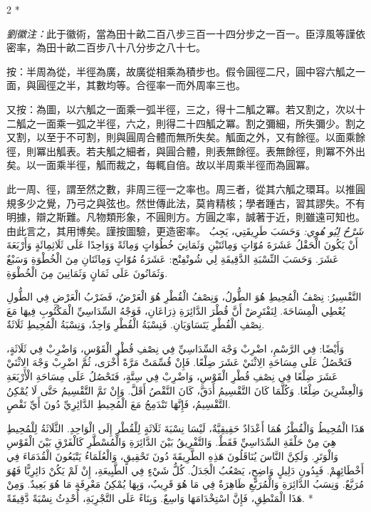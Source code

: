 \documentclass[11pt,a4paper]{article}
\newcommand{\ar}[1]{\arabicfont\beginR #1\endR}
\newenvironment{bilingual}{%
  \begin{paracol}{2}%
  \switchcolumn[0]*%
}{%
  \end{paracol}%
}
\newcommand{\cnline}[1]{\switchcolumn[0]\noindent #1 \switchcolumn[1]}
\newcommand{\arline}[1]{\noindent\ar{#1} \switchcolumn[0]*}
\newenvironment{prob bilingual}{%
  \begin{paracol}{2}%
  \switchcolumn[0]*%
}{%
  \end{paracol}%
  \vspace{0.3em}%
}
\begin{document}
\begin{bilingual}
\cnline{%
\textcolor{commentarycolor}{\small\textit{劉徽注：}}此于徽術，當為田十畝二百八步三百一十四分步之一百一。臣淳風等謹依密率，為田十畝二百步八十八分步之八十七。

按：半周為從，半徑為廣，故廣從相乘為積步也。假令圓徑二尺，圓中容六觚之一面，與圓徑之半，其數均等。合徑率一而外周率三也。

又按：為圖，以六觚之一面乘一弧半徑，三之，得十二觚之冪。若又割之，次以十二觚之一面乘一弧之半徑，六之，則得二十四觚之冪。割之彌細，所失彌少。割之又割，以至于不可割，則與圓周合體而無所失矣。觚面之外，又有餘徑。以面乘餘徑，則冪出觚表。若夫觚之細者，與圓合體，則表無餘徑。表無餘徑，則冪不外出矣。以一面乘半徑，觚而裁之，每輒自倍。故以半周乘半徑而為圓冪。

此一周、徑，謂至然之數，非周三徑一之率也。周三者，從其六觚之環耳。以推圓規多少之覺，乃弓之與弦也。然世傳此法，莫肯精核；學者踵古，習其謬失。不有明據，辯之斯難。凡物類形象，不圓則方。方圓之率，誠著于近，則雖遠可知也。由此言之，其用博矣。謹按圖驗，更造密率。
}
\arline{%
\textcolor{commentarycolor}{\small\textit{شَرْحُ لِيُو هُوِي:}} وَحَسَبَ طَرِيقَتِي، يَجِبُ أَنْ يَكُونَ الْحَقْلُ عَشَرَةَ مُوّاتٍ وَمِائَتَيْنِ وَثَمَانِيَ خُطُوَاتٍ وَمِائَةً وَوَاحِدًا عَلَى ثَلَاثِمِائَةٍ وَأَرْبَعَةَ عَشَرَ. وَحَسَبَ النِّسْبَةِ الدَّقِيقَةِ لِي شُونْفِنْج: عَشَرَةُ مُوّاتٍ وَمِائَتَانِ مِنَ الْخُطْوَةِ وَسَبْعٌ وَثَمَانُونَ عَلَى ثَمَانٍ وَثَمَانِينَ مِنَ الْخُطْوَةِ.

التَّفْسِيرُ: نِصْفُ الْمُحِيطِ هُوَ الطُّولُ، وَنِصْفُ الْقُطْرِ هُوَ الْعَرْضُ، فَضَرْبُ الْعَرْضِ فِي الطُّولِ يُعْطِي الْمِسَاحَةَ. لِنَفْتَرِضْ أَنَّ قُطْرَ الدَّائِرَةِ ذِرَاعَانِ، فَوَجْهُ السِّدَاسِيِّ الْمَكْتُوبِ فِيهَا مَعَ نِصْفِ الْقُطْرِ يَتَسَاوَيَانِ. فَنِسْبَةُ الْقُطْرِ وَاحِدٌ، وَنِسْبَةُ الْمُحِيطِ ثَلَاثَةٌ.

وَأَيْضًا: فِي الرَّسْمِ، اضْرِبْ وَجْهَ السِّدَاسِيِّ فِي نِصْفِ قُطْرِ الْقَوْسِ، وَاضْرِبْ فِي ثَلَاثَةٍ، فَتَحْصُلُ عَلَى مِسَاحَةِ الِاثْنَيْ عَشَرَ ضِلْعًا. فَإِنْ قُسِّمَتْ مَرَّةً أُخْرَى، ثُمَّ اضْرِبْ وَجْهَ الِاثْنَيْ عَشَرَ ضِلْعًا فِي نِصْفِ قُطْرِ الْقَوْسِ، وَاضْرِبْ فِي سِتَّةٍ، فَتَحْصُلُ عَلَى مِسَاحَةِ الْأَرْبَعَةِ وَالْعِشْرِينَ ضِلْعًا. وَكُلَّمَا كَانَ التَّقْسِيمُ أَدَقَّ، كَانَ النَّقْصُ أَقَلَّ. وَإِنْ تَمَّ التَّقْسِيمُ حَتَّى لَا يُمْكِنُ التَّقْسِيمُ، فَإِنَّهَا تَنْدَمِجُ مَعَ الْمُحِيطِ الدَّائِرِيِّ دُونَ أَيِّ نَقْصٍ.

هَذَا الْمُحِيطُ وَالْقُطْرُ هُمَا أَعْدَادٌ حَقِيقِيَّةٌ، لَيْسَا نِسْبَةَ ثَلَاثَةٍ لِلْقُطْرِ إِلَى الْوَاحِدِ. الثَّلَاثَةُ لِلْمُحِيطِ هِيَ مِنْ حَلْقَةِ السِّدَاسِيِّ فَقَطْ. وَالتَّفْرِيقُ بَيْنَ الدَّائِرَةِ وَالْمُسْطَّرِ كَالْفَرْقِ بَيْنَ الْقَوْسِ وَالْوَتَرِ. وَلَكِنَّ النَّاسَ يُنَاقَلُونَ هَذِهِ الطَّرِيقَةَ دُونَ تَحْقِيقٍ، وَالْعُلَمَاءُ يَتْبَعُونَ الْقُدَمَاءَ فِي أَخْطَائِهِمْ. فَبِدُونِ دَلِيلٍ وَاضِحٍ، يَصْعُبُ الْجَدَلُ. كُلُّ شَيْءٍ فِي الطَّبِيعَةِ، إِنْ لَمْ يَكُنْ دَائِرِيًّا فَهُوَ مُرَبَّعٌ. وَنِسَبُ الدَّائِرَةِ وَالْمُرَبَّعِ ظَاهِرَةٌ فِي مَا هُوَ قَرِيبٌ، وَبِهَا يُمْكِنُ مَعْرِفَةِ مَا هُوَ بَعِيدٌ. وَمِنْ هَذَا الْمَنْطِقِ، فَإِنَّ اسْتِخْدَامَهَا وَاسِعٌ. وَبِنَاءً عَلَى التَّجْرِبَةِ، أُحْدِثُ نِسْبَةً دَّقِيقَةً.
}
\end{bilingual}
\end{document}
